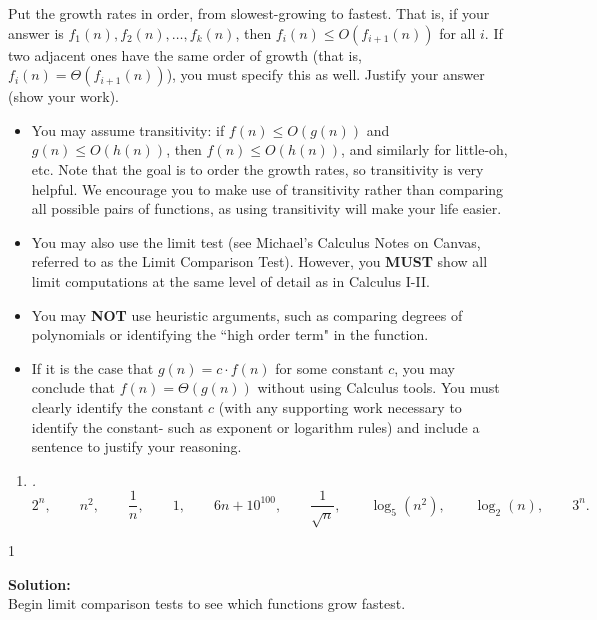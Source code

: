 \documentclass[9pt]{article}
\def\solutions{1}
\begin{document}
\item 
Put the growth rates in order, from slowest-growing to fastest. That is, if your answer is $f_1(n), f_2(n), \dotsc, f_k(n)$, then $f_i(n) \leq O(f_{i+1}(n))$ for all $i$. If two adjacent ones have the same order of growth (that is, $f_i(n) = \Theta(f_{i+1}(n))$), you must specify this as well. Justify your answer (show your work). 
\begin{itemize}
\item You may assume transitivity: if $f(n) \leq O(g(n))$ and $g(n) \leq O(h(n))$, then $f(n) \leq O(h(n))$, and similarly for little-oh, etc. Note that the goal is to order the growth rates, so transitivity is very helpful. We encourage you to make use of transitivity rather than comparing all possible pairs of functions, as using transitivity will make your life easier.

\item You may also use the limit test (see Michael's Calculus Notes on Canvas, referred to as the Limit Comparison Test). However, you \textbf{MUST} show all limit computations at the same level of detail as in Calculus I-II.
\item You may \textbf{NOT} use heuristic arguments, such as comparing degrees of polynomials or identifying the ``high order term" in the function.
\item If it is the case that $g(n) = c \cdot f(n)$ for some constant $c$, you may conclude that $f(n) = \Theta(g(n))$ without using Calculus tools. You must clearly identify the constant $c$ (with any supporting work necessary to identify the constant- such as exponent or logarithm rules) and include a sentence to justify your reasoning. 
\end{itemize}


\begin{enumerate}
\item \label{2a} {\itshape.
\[
2^n, \qquad 
n^2, \qquad
\frac{1}{n}, \qquad
1, \qquad
6n+10^{100}, \qquad
\frac{1}{\sqrt{n}}, \qquad
\log_5(n^2), \qquad
\log_2(n), \qquad
3^n.
\]
}

\end{enumerate}

\if\solutions1
\vspace{2mm}

\textbf{Solution:} \\
Begin limit comparison tests to see which functions grow fastest.\\
\end{document}
